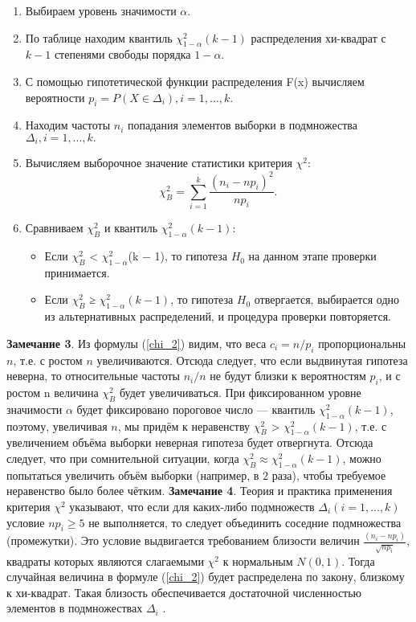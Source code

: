 \documentclass[../body.tex]{subfiles}
\begin{document}
	\begin{enumerate}
		\item Выбираем уровень значимости $\alpha$.
		\item  По таблице \cite[c.~ 358]{math} находим квантиль $\chi^{2}_{1-\alpha}(k - 1)$ распределения хи-квадрат с $k−1$ степенями свободы порядка $1-\alpha$. 
		\item С помощью гипотетической функции распределения F(x) вычисляем вероятности $p_{i} = P (X \in \Delta_{i}), i = 1, ... ,k.$
		\item Находим частоты $n_{i}$ попадания элементов выборки в подмножества $\Delta_{i}, i = 1, ... ,k.$ 
		\item Вычисляем выборочное значение статистики критерия $\chi^{2}$:
		\begin{equation}
			\chi^{2}_{B} =\sum_{i = 1}^{k}{\frac{(n_{i} - np_{i})^{2}}{np_{i}}}.
			\label{chi_B}
		\end{equation}
		\item Сравниваем $\chi^{2}_{B}$ и квантиль $\chi^{2}_{1-\alpha}(k-1)$:
		\begin{itemize}
			\item Если $\chi^{2}_{B}$ < $\chi^{2}_{1-\alpha}$(k $-$ 1), то гипотеза $H_{0}$ на данном этапе проверки принимается. 
			\item Если $\chi^{2}_{B}$ ≥ $\chi^{2}_{1-\alpha}(k -1)$, то гипотеза $H_{0}$ отвергается, выбирается одно из альтернативных распределений, и процедура проверки повторяется.
		\end{itemize}
	\end{enumerate}
	\textbf{Замечание 3}. Из формулы (\ref{chi_2}) видим, что веса $c_{i} = n/p_{i}$ пропорциональны $n$, т.е. с ростом $n$ увеличиваются. Отсюда следует, что если выдвинутая гипотеза неверна, то относительные частоты $n_{i}/n$ не будут близки к вероятностям $p_{i}$, и с ростом n величина  $\chi^{2}_{B}$  будет увеличиваться. При фиксированном уровне значимости $\alpha$ будет фиксировано пороговое число — квантиль $\chi^{2}_{1-\alpha}(k-1)$, поэтому, увеличивая $n$, мы придём к неравенству $\chi^{2}_{B}$ > $\chi^{2}_{1-\alpha}(k-1)$, т.е. с увеличением объёма выборки неверная гипотеза будет отвергнута.
	\newline
	Отсюда следует, что при сомнительной ситуации, когда $\chi^{2}_{B} \approx \chi^{2}_{1-\alpha}(k-1)$, можно попытаться увеличить объём выборки (например, в $2$ раза), чтобы требуемое неравенство было более чётким.
	\newline
	\textbf{Замечание 4}. Теория и практика применения критерия  $\chi^{2}$ указывают, что если для каких-либо подмножеств $\Delta_{i} (i = 1, ... ,k)$ условие $np_{i} \geq 5$ не выполняется, то следует объединить соседние подмножества (промежутки).
	\newline
	Это условие выдвигается требованием близости величин $\frac{(n_{i} −np_{i})}{\sqrt{np_{i}}}$, квадраты которых являются слагаемыми $\chi^{2}$  к нормальным $N(0,1)$. Тогда случайная величина в формуле (\ref{chi_2}) будет распределена по закону, близкому к хи-квадрат. Такая близость обеспечивается достаточной численностью элементов в подмножествах $\Delta_{i}$ \cite[с.~ 481-485]{max}.
\end{document}
